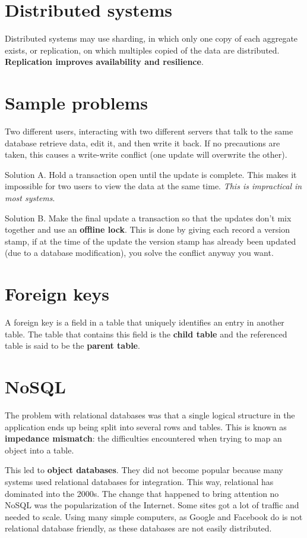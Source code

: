 \documentclass[12pt, oneside]{book}
\begin{document}
\section{Distributed systems}
Distributed systems may use sharding, in which only one copy of each aggregate
exists, or replication, on which multiples copied of the data are distributed.
\textbf{Replication improves availability and resilience}.

\section{Sample problems}
Two different users, interacting with two different servers that talk to the
same database retrieve data, edit it, and then write it back. If no precautions
are taken, this causes a write-write conflict (one update will overwrite the
other).

Solution A. Hold a transaction open until the update is complete. This makes it
impossible for two users to view the data at the same time. \textit{This is
impractical in most systems}.

Solution B. Make the final update a transaction so that the updates don't mix
together and use an \textbf{offline lock}. This is done by giving each record a
version stamp, if at the time of the update the version stamp has already been
updated (due to a database modification), you solve the conflict anyway you
want.

\section{Foreign keys}
A foreign key is a field in a table that uniquely identifies an entry in another
table. The table that contains this field is the \textbf{child table} and the
referenced table is said to be the \textbf{parent table}.

\section{NoSQL}
The problem with relational databases was that a single logical structure in the
application ends up being split into several rows and tables. This is known as
\textbf{impedance mismatch}: the difficulties encountered when trying to map
an object into a table.

This led to \textbf{object databases}. They did not become popular because many
systems used relational databases for integration. This way, relational has
dominated into the 2000s. The change that happened to bring attention no NoSQL
was the popularization of the Internet. Some sites got a lot of traffic and
needed to scale. Using many simple computers, as Google and Facebook do is not
relational database friendly, as these databases are not easily distributed.
\end{document}
